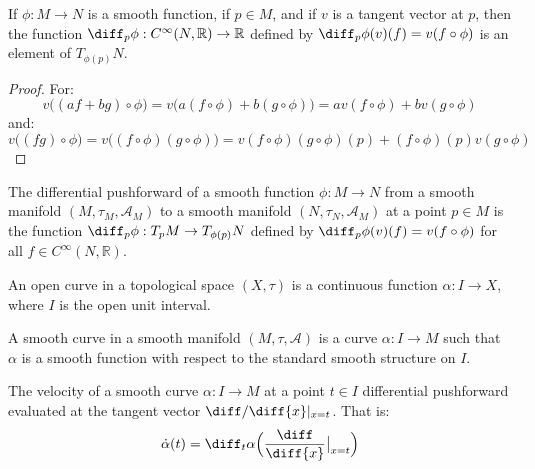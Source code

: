 \documentclass{article}                                                        %
\begin{document}
        \begin{theorem}
            If $\phi:M\rightarrow{N}$ is a smooth function, if $p\in{M}$, and if
            $v$ is a tangent vector at $p$, then the function
            $\diff_{p}\phi:C^{\infty}(N,\mathbb{R})\rightarrow\mathbb{R}$
            defined by $\diff_{p}\phi(v)(f)=v(f\circ\phi)$ is an element of
            $T_{\phi(p)}N$.
        \end{theorem}
        \begin{proof}
            For:
            \begin{equation}
                v\big((af+bg)\circ\phi\big)
                =v\big(a(f\circ\phi)+b(g\circ\phi)\big)
                =av(f\circ\phi)+bv(g\circ\phi)
            \end{equation}
            and:
            \begin{equation}
                v\big((fg)\circ\phi\big)
                =v\big((f\circ\phi)(g\circ\phi)\big)
                =v(f\circ\phi)(g\circ\phi)(p)+(f\circ\phi)(p)v(g\circ\phi)
            \end{equation}
        \end{proof}
        \begin{definition}
            The differential pushforward of a smooth function
            $\phi:M\rightarrow{N}$ from a smooth manifold
            $(M,\tau_{M},\mathcal{A}_{M})$ to a smooth manifold
            $(N,\tau_{N},\mathcal{A}_{M})$ at a point $p\in{M}$ is the function
            $\diff_{p}\phi:T_{p}M\rightarrow{T}_{\phi(p)}N$ defined by
            $\diff_{p}\phi(v)(f)=v(f\circ\phi)$ for all
            $f\in{C}^{\infty}(N,\mathbb{R})$.
        \end{definition}
        \begin{definition}
            An open curve in a topological space $(X,\tau)$ is a continuous
            function $\alpha:I\rightarrow{X}$, where $I$ is the open unit
            interval.
        \end{definition}
        \begin{definition}
            A smooth curve in a smooth manifold $(M,\tau,\mathcal{A})$ is a
            curve $\alpha:I\rightarrow{M}$ such that $\alpha$ is a smooth
            function with respect to the standard smooth structure on $I$.
        \end{definition}
        \begin{definition}
            The velocity of a smooth curve $\alpha:I\rightarrow{M}$ at a point
            $t\in{I}$ differential pushforward evaluated at the tangent vector
            $\diff/\diff{x}|_{x=t}$. That is:
            \begin{equation}
                \dot{\alpha}(t)=
                    \diff_{t}\alpha\Big(\frac{\diff}{\diff{x}}\big|_{x=t}\Big)
            \end{equation}
        \end{definition}
\end{document}
